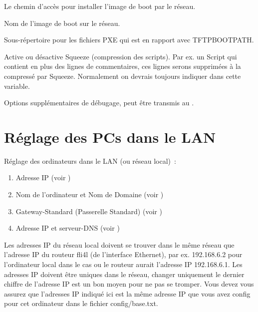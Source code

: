 \begin{description}

  Le chemin d'accès pour installer l'image de boot par le réseau.


  Nom de l'image de boot sur le réseau.


  Sous-répertoire pour les fichiers PXE qui est en rapport avec TFTPBOOTPATH.


  Active ou désactive Squeeze (compression des scripts). Par ex. un
  Script qui contient en plus des lignes de commentaires, ces lignes
  serons supprimées à la compressé par Squeeze. Normalement on devrais
  toujours indiquer  dans cette variable.


   Options supplémentaires de débugage, peut être transmis au .

  \end{description}

  \chapter{Réglage des PCs dans le LAN}

  Réglage des ordinateurs dans le LAN (ou réseau local)~:

  \begin{enumerate}
  \item Adresse IP (voir )
  \item Nom de l'ordinateur et Nom de Domaine
    (voir )
  \item Gateway-Standard (Passerelle Standard) (voir )
  \item Adresse IP et serveur-DNS (voir )
  \end{enumerate}


  Les adresses IP du réseau local doivent se trouver dans le même
  réseau que l'adresse IP du routeur fli4l (de l'interface Ethernet),
  par ex. 192.168.6.2 pour l'ordinateur local dans le cas ou le routeur
  aurait l'adresse IP 192.168.6.1. Les adresses IP doivent être uniques
  dans le réseau, changer uniquement le dernier chiffre de l'adresse IP
  est un bon moyen pour ne pas se tromper. Vous devez vous assurez que
  l'adresses IP indiqué ici est la même adresse IP que vous avez config
  pour cet ordinateur dans le fichier config/base.txt.

